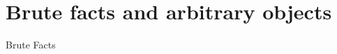 %
%
%
%
%
%

\chapter{Brute facts and arbitrary objects}
\chaptername{Brute Facts}
	\fancyhead[CO]{\textsc{\thetitle}}

